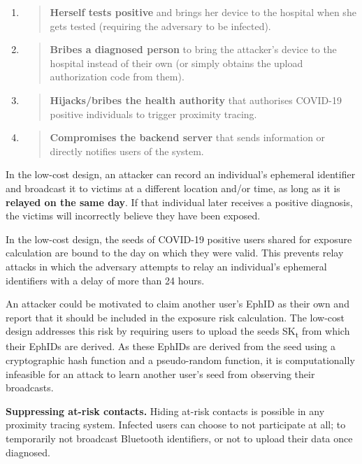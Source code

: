 \documentclass{article}
\begin{document}
\begin{enumerate}
\def\labelenumi{\arabic{enumi}.}
\item
  \begin{quote}
  \textbf{Herself tests positive} and brings her device to the hospital
  when she gets tested (requiring the adversary to be infected).
  \end{quote}
\item
  \begin{quote}
  \textbf{Bribes a diagnosed person} to bring the attacker's device to
  the hospital instead of their own (or simply obtains the upload
  authorization code from them).
  \end{quote}
\item
  \begin{quote}
  \textbf{Hijacks/bribes the health authority} that authorises COVID-19
  positive individuals to trigger proximity tracing.
  \end{quote}
\item
  \begin{quote}
  \textbf{Compromises the backend server} that sends information or
  directly notifies users of the system.
  \end{quote}
\end{enumerate}

In the low-cost design, an attacker can record an individual's ephemeral
identifier and broadcast it to victims at a different location and/or
time, as long as it is \textbf{relayed on the same day}. If that
individual later receives a positive diagnosis, the victims will
incorrectly believe they have been exposed.

In the low-cost design, the seeds of COVID-19 positive users shared for
exposure calculation are bound to the day on which they were valid. This
prevents relay attacks in which the adversary attempts to relay an
individual's ephemeral identifiers with a delay of more than 24 hours.

An attacker could be motivated to claim another user's EphID as their
own and report that it should be included in the exposure risk
calculation. The low-cost design addresses this risk by requiring users
to upload the seeds SK\textsubscript{t} from which their EphIDs are
derived. As these EphIDs are derived from the seed using a cryptographic
hash function and a pseudo-random function, it is computationally
infeasible for an attack to learn another user's seed from observing
their broadcasts.

\textbf{Suppressing at-risk contacts.} Hiding at-risk contacts is
possible in any proximity tracing system. Infected users can choose to
not participate at all; to temporarily not broadcast Bluetooth
identifiers, or not to upload their data once diagnosed.
\end{document}
